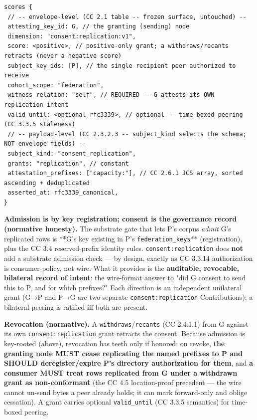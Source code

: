 \documentclass[11pt]{article}
\begin{document}
\begin{lstlisting}
scores {
 // -- envelope-level (CC 2.1 table -- frozen surface, untouched) --
 attesting_key_id: G, // the granting (sending) node
 dimension: "consent:replication:v1",
 score: <positive>, // positive-only grant; a withdraws/recants retracts (never a negative score)
 subject_key_ids: [P], // the single recipient peer authorized to receive
 cohort_scope: "federation",
 witness_relation: "self", // REQUIRED -- G attests its OWN replication intent
 valid_until: <optional rfc3339>, // optional -- time-boxed peering (CC 3.3.5 staleness)
 // -- payload-level (CC 2.3.2.3 -- subject_kind selects the schema; NOT envelope fields) --
 subject_kind: "consent_replication",
 grants: "replication", // constant
 attestation_prefixes: ["capacity:"], // CC 2.6.1 JCS array, sorted ascending + deduplicated
 asserted_at: rfc3339_canonical,
}
\end{lstlisting}

\textbf{Admission is by key registration; consent is the governance record (normative honesty).} The substrate gate that lets P's corpus \textit{admit} G's replicated rows is **G's key existing in P's \texttt{federation\_keys}** (registration), plus the CC 3.4 reserved-prefix identity rules. \texttt{consent:replication} does \textbf{not} add a substrate admission check — by design, exactly as CC 3.3.14 authorization is consumer-policy, not wire. What it provides is the \textbf{auditable, revocable, bilateral record of intent}: the wire-format answer to "did G consent to send this to P, and for which prefixes?" Each direction is an independent unilateral grant (G→P and P→G are two separate \texttt{consent:replication} Contributions); a bilateral peering is ratified iff both are present.


\textbf{Revocation (normative).} A \texttt{withdraws}/\texttt{recants} (CC 2.4.1.1) from G against its own \texttt{consent:replication} grant retracts the consent. Because admission is key-rooted (above), revocation has teeth only if honored: on revoke, \textbf{the granting node MUST cease replicating the named prefixes to P and SHOULD deregister/expire P's directory authorization for them}, and \textbf{a consumer MUST treat rows replicated from G under a withdrawn grant as non-conformant} (the CC 4.5 location-proof precedent — the wire cannot un-send bytes a peer already holds; it can mark forward-only and oblige cessation). A grant carries optional \texttt{valid\_until} (CC 3.3.5 semantics) for time-boxed peering.
\end{document}
